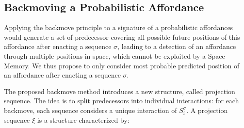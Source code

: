 \documentclass[conference]{IEEEtran}
\begin{document}


\subsection{Backmoving a Probabilistic Affordance}\label{backmove}

Applying the backmove principle to a signature of a probabilistic affordances would generate a set of predecessor covering all possible future positions of this affordance after enacting a sequence $\sigma$, leading to a detection of an affordance through multiple positions in space, which
cannot be exploited by a Space Memory.
We thus propose to only consider most probable predicted position of an affordance after enacting a sequence $\sigma$.

The proposed backmove method introduces a new structure, called projection sequence. The idea is to split predecessors into individual interactions: for each backmove, each sequence considers a unique interaction of $S_i^{\sigma}$.
A projection sequence $\xi$ is a structure characterized by:
\end{document}
